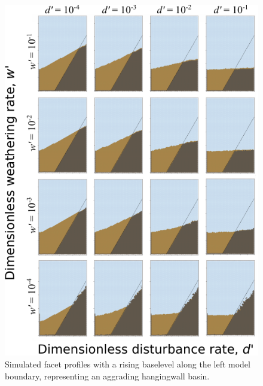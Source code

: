 \begin{figure}[ht!]
\centerline{\includegraphics{Figures/four_by_four_profiles_baselevel_rise.pdf}}
\caption{Simulated facet profiles with a rising baselevel along the left model boundary, representing an aggrading hangingwall basin.}
\label{fig:baselevelrise}
\end{figure}















%
%
%

